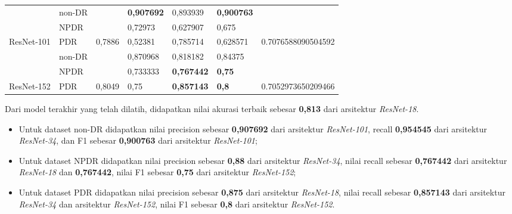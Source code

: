 \begin{table}[H]
\begin{center}
\begin{tabular}{|c|l|c|l|l|l|c|}
			& non-DR                                             &                          & \textbf{0,907692} & 0,893939 & \textbf{0,900763} &                    \\ \cline{2-2} \cline{4-6}
			& NPDR                                               &                          & 0,72973  & 0,627907 & 0,675    &                                      \\ \cline{2-2} \cline{4-6}
			\multirow{-3}{*}{ResNet-101} & PDR                                                & \multirow{-3}{*}{0,7886} & 0,52381  & 0,785714 & 0,628571 & \multirow{-3}{*}{0.7076588090504592} \\ \hline
			& non-DR                                             &                          & 0,870968 & 0,818182 & 0,84375  &                                      \\ \cline{2-2} \cline{4-6}
			& NPDR                                               &                          & 0,733333 & \textbf{0,767442} & \textbf{0,75}     &                    \\ \cline{2-2} \cline{4-6}
			\multirow{-3}{*}{ResNet-152} & PDR                                                & \multirow{-3}{*}{0,8049} & 0,75     & \textbf{0,857143} & \textbf{0,8}      & \multirow{-3}{*}{0.7052973650209466} \\ \hline
		\end{tabular}
	\end{center}
\end{table}

Dari model terakhir yang telah dilatih, didapatkan nilai akurasi terbaik sebesar \textbf{0,813} dari arsitektur \emph{ResNet-18}.

\begin{itemize}
	
	\item Untuk dataset non-DR didapatkan nilai precision sebesar \textbf{0,907692} dari arsitektur \emph{ResNet-101}, recall \textbf{0,954545} dari arsitektur \emph{ResNet-34}, dan F1 sebesar \textbf{0,900763} dari arsitektur \emph{ResNet-101};
	
	\item Untuk dataset NPDR didapatkan nilai precision sebesar \textbf{0,88} dari arsitektur \emph{ResNet-34}, nilai recall sebesar \textbf{0,767442} dari arsitektur \emph{ResNet-18} dan \textbf{0,767442}, nilai F1 sebesar \textbf{0,75} dari arsitektur \emph{ResNet-152};
	
	\item Untuk dataset PDR didapatkan nilai precision sebesar \textbf{0,875} dari arsitektur \emph{ResNet-18}, nilai recall sebesar \textbf{0,857143} dari arsitektur \emph{ResNet-34} dan arsitektur \emph{ResNet-152}, nilai F1 sebesar \textbf{0,8} dari arsitektur \emph{ResNet-152}.
	
\end{itemize}


